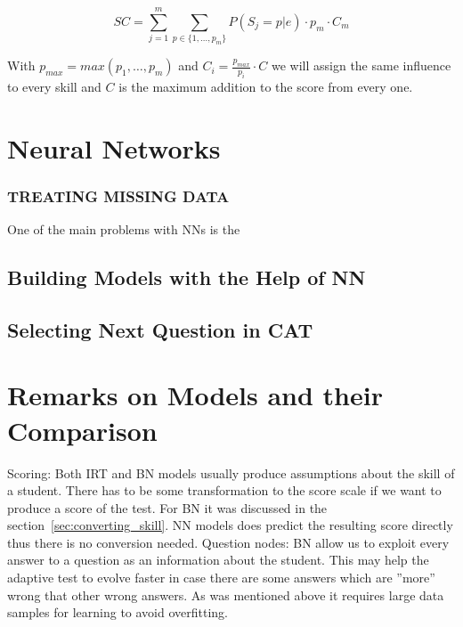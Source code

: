 \begin{equation}
SC = \sum_{j=1}^m{\sum_{p\in \{1,\ldots,p_m\}}{P(S_j=p|e)\cdot p_m\cdot C_m}} 
\label{eq:scoresum2}
\end{equation}

With $p_{max} = max(p_1,\ldots, p_m)$ and $C_i = \frac{p_{max}}{p_i}\cdot C$ we will assign the same influence to every skill and $C$ is the maximum addition to the score from every one.

\section{Neural Networks}

\subsubsection{TREATING MISSING DATA}
One of the main problems with NNs is the 

\subsection{Building Models with the Help of NN}

\subsection{Selecting Next Question in CAT}

\section{Remarks on Models and their Comparison}
Scoring: Both IRT and BN models usually produce assumptions about the skill of a student. There has to be some transformation to the score scale if we want to produce a score of the test. For BN it was discussed in the section~\ref{sec:converting_skill}. NN models does predict the resulting score directly thus there is no conversion needed.
Question nodes: BN allow us to exploit every answer to a question as an information about the student. This may help the adaptive test to evolve faster in case there are some answers which are ''more'' wrong that other wrong answers. As was mentioned above it requires large data samples for learning to avoid overfitting.